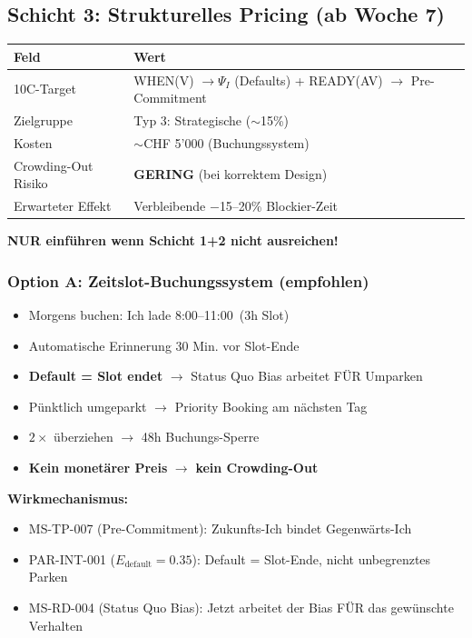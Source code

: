 \documentclass[11pt,a4paper]{article}
\begin{document}
\subsection{Schicht 3: Strukturelles Pricing (ab Woche 7)}

\begin{table}[H]
\centering
\begin{tabular}{ll}
\toprule
\textbf{\color{fadarkblue}Feld} & \textbf{\color{fadarkblue}Wert} \\
\midrule
10C-Target & WHEN(V) $\rightarrow \Psi_I$ (Defaults) + READY(AV) $\rightarrow$ Pre-Commitment \\
Zielgruppe & Typ 3: Strategische ($\sim$15\%) \\
Kosten & $\sim$CHF 5'000 (Buchungssystem) \\
Crowding-Out Risiko & \textcolor{famint}{\textbf{GERING}} (bei korrektem Design) \\
Erwarteter Effekt & Verbleibende $-$15--20\% Blockier-Zeit \\
\bottomrule
\end{tabular}
\end{table}

\textbf{NUR einf\"uhren wenn Schicht 1+2 nicht ausreichen!}

\subsubsection{Option A: Zeitslot-Buchungssystem (empfohlen)}

\begin{itemize}[noitemsep]
\item Morgens buchen: \guillemotleft Ich lade 8:00--11:00\guillemotright\ (3h Slot)
\item Automatische Erinnerung 30 Min. vor Slot-Ende
\item \textbf{Default = Slot endet} $\rightarrow$ Status Quo Bias arbeitet F\"UR Umparken
\item P\"unktlich umgeparkt $\rightarrow$ Priority Booking am n\"achsten Tag
\item $2\times$ \"uberziehen $\rightarrow$ 48h Buchungs-Sperre
\item \textbf{Kein monet\"arer Preis} $\rightarrow$ \textbf{kein Crowding-Out}
\end{itemize}

\textbf{Wirkmechanismus:}
\begin{itemize}[noitemsep]
\item MS-TP-007 (Pre-Commitment): Zukunfts-Ich bindet Gegenw\"arts-Ich
\item PAR-INT-001 ($E_{\text{default}} = 0.35$): Default = Slot-Ende, nicht unbegrenztes Parken
\item MS-RD-004 (Status Quo Bias): Jetzt arbeitet der Bias F\"UR das gew\"unschte Verhalten
\end{itemize}
\end{document}
